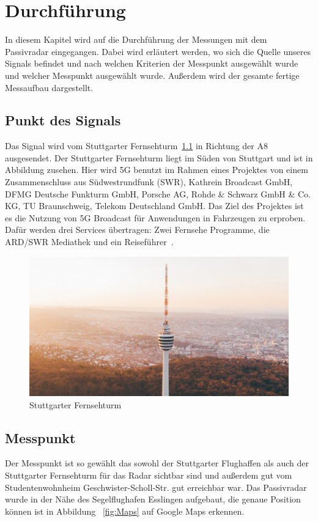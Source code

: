 \chapter{Durchführung}
In diesem Kapitel wird auf die Durchführung der Messungen mit dem Passivradar eingegangen. Dabei wird erläutert werden, wo sich die Quelle unseres Signals befindet und nach welchen Kriterien der Messpunkt ausgewählt wurde und welcher Messpunkt ausgewählt wurde. Außerdem wird der gesamte fertige Messaufbau dargestellt.
\section{Punkt des Signals}
Das Signal wird vom Stuttgarter Fernsehturm~\ref{fig:Fernsehturm} in Richtung der A8 ausgesendet. Der Stuttgarter Fernsehturm liegt im Süden von Stuttgart und ist in Abbildung zusehen. Hier wird 5G benutzt im Rahmen eines Projektes von einem Zusammenschluss aus Südwestrundfunk (SWR), Kathrein Broadcast GmbH,  DFMG  Deutsche Funkturm GmbH, Porsche AG, Rohde \& Schwarz GmbH \& Co. KG, TU Braunschweig, Telekom Deutschland GmbH. Das Ziel des Projektes ist es die Nutzung von 5G Broadcast für Anwendungen in Fahrzeugen zu erproben. Dafür werden drei Services übertragen: Zwei Fernsehe Programme, die ARD/SWR Mediathek und ein Reiseführer~\cite{5GMAG2021}. 
\begin{figure}
    \centering
    \includegraphics[width=\textwidth]{images/Fernsehturm.jpg}
    \caption{Stuttgarter Fernsehturm}\label{fig:Fernsehturm}
\end{figure}
\section{Messpunkt}
Der Messpunkt ist so gewählt das sowohl der Stuttgarter Flughaffen als auch der Stuttgarter Fernsehturm für das Radar sichtbar sind und außerdem gut vom Studentenwohnheim Geschwister-Scholl-Str. gut erreichbar war. Das Passivradar wurde in der Nähe des Segelflughafen Esslingen aufgebaut, die genaue Position können ist in Abbildung ~\ref{fig:Maps} auf Google Maps erkennen.

